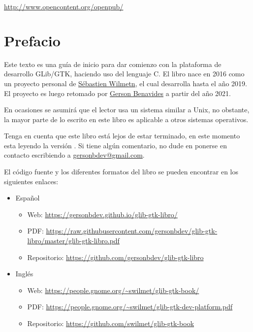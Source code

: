     \url{http://www.opencontent.org/openpub/}

\newpage

\section{Prefacio}
    Este texto es una guía de inicio para dar comienzo con la plataforma de desarrollo GLib/GTK, haciendo uso del lenguaje C. El libro nace en 2016 como un proyecto personal de \href{https://louvilug.tuxfamily.org/swilmet/}{Sébastien Wilmetn}, el cual desarrolla hasta el año 2019. El proyecto es luego retomado por \href{https://gersonbdev.github.io/about/}{Gerson Benavides} a partir del año 2021.
    
    En ocasiones se asumirá que el lector usa un sistema similar a Unix, no obstante, la mayor parte de lo escrito en este libro es aplicable a otros sistemas operativos.
    
    Tenga en cuenta que este libro está lejos de estar terminado, en este momento esta leyendo la versión \bookversion. Si tiene algún comentario, no dude en ponerse en contacto escribiendo a \href{mailto:gersonbdev@gmail.com}{gersonbdev@gmail.com}.
    
    El código fuente y los diferentes formatos del libro se pueden encontrar en los siguientes enlaces:
    
    \begin{itemize}
        \item Español
            \begin{itemize}
                \item Web: \url{https://gersonbdev.github.io/glib-gtk-libro/}
                \item PDF: \url{https://raw.githubusercontent.com/gersonbdev/glib-gtk-libro/master/glib-gtk-libro.pdf}
                \item Repositorio: \url{https://github.com/gersonbdev/glib-gtk-libro}
            \end{itemize}
        \item Inglés
            \begin{itemize}
                \item Web: \url{https://people.gnome.org/~swilmet/glib-gtk-book/}
                \item PDF: \url{https://people.gnome.org/~swilmet/glib-gtk-dev-platform.pdf}
                \item Repositorio: \url{https://github.com/swilmet/glib-gtk-book}
            \end{itemize}
    \end{itemize}


